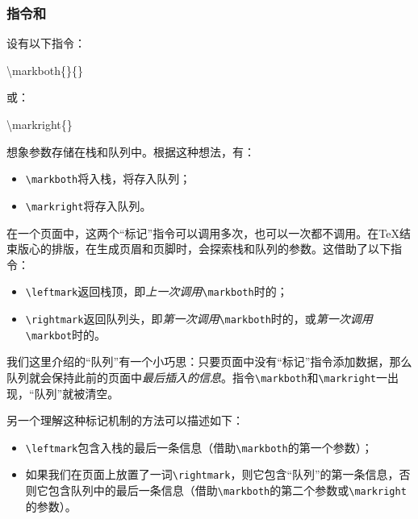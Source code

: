\subsubsection{指令和}

设有以下指令：

\begin{dmd}
\backslash markboth\{\}\{\}
\end{dmd}

或：

\begin{dmd}
\backslash markright\{\}
\end{dmd}

想象参数存储在栈和队列中。根据这种想法，有：

\begin{itemize}
    \item \verb|\markboth|将入栈，将存入队列；
    \item \verb|\markright|将存入队列。
\end{itemize}

在一个页面中，这两个“标记”指令可以调用多次，也可以一次都不调用。在\TeX 结束版心的排版，在生成页眉和页脚时，会探索栈和队列的参数。这借助了以下指令：

\begin{itemize}
    \item \verb|\leftmark|返回栈顶，即\emph{上一次调用}\verb|\markboth|时的；
    \item \verb|\rightmark|返回队列头，即\emph{第一次调用}\verb|\markboth|时的，或\emph{第一次调用}\verb|\markbot|时的。
\end{itemize}

\begin{exclamation}
我们这里介绍的“队列”有一个小巧思：只要页面中没有“标记”指令添加数据，那么队列就会保持此前的页面中\emph{最后插入的信息}。指令\verb|\markboth|和\verb|\markright|一出现，“队列”就被清空。
\end{exclamation}

另一个理解这种标记机制的方法可以描述如下：

\begin{itemize}
    \item \verb|\leftmark|包含入栈的最后一条信息（借助\verb|\markboth|的第一个参数）；
    \item 如果我们在页面上放置了一词\verb|\rightmark|，则它包含“队列”的第一条信息，否则它包含队列中的最后一条信息（借助\verb|\markboth|的第二个参数或\verb|\markright|的参数）。
\end{itemize}

